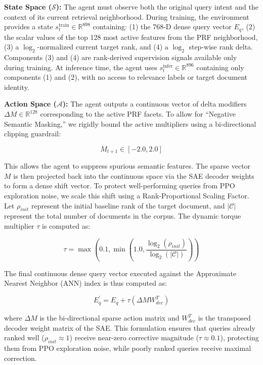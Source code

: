 \documentclass[sigconf]{acmart}
\begin{document}
\textbf{State Space ($\mathcal{S}$):} The agent must observe both the original query intent and the context of its current retrieval neighborhood. During training, the environment provides a state $s_t^{\text{train}} \in \mathbb{R}^{898}$ containing: (1) the 768-D dense query vector $E_q$, (2) the scalar values of the top 128 most active features from the PRF neighborhood, (3) a $\log_2$-normalized current target rank, and (4) a $\log_2$ step-wise rank delta. Components (3) and (4) are rank-derived supervision signals available only during training. At inference time, the agent uses $s_t^{\text{infer}} \in \mathbb{R}^{896}$ containing only components (1) and (2), with no access to relevance labels or target document identity.

\textbf{Action Space ($\mathcal{A}$):} The agent outputs a continuous vector of delta modifiers $\Delta M \in \mathbb{R}^{128}$ corresponding to the active PRF facets. To allow for ``Negative Semantic Masking,'' we rigidly bound the active multipliers using a bi-directional clipping guardrail:

\begin{equation}
M_{t+1} \in [-2.0, 2.0]
\end{equation}

This allows the agent to suppress spurious semantic features. The sparse vector $M$ is then projected back into the continuous space via the SAE decoder weights to form a dense shift vector. To protect well-performing queries from PPO exploration noise, we scale this shift using a Rank-Proportional Scaling Factor. Let $\rho_{init}$ represent the initial baseline rank of the target document, and $|\mathcal{C}|$ represent the total number of documents in the corpus. The dynamic torque multiplier $\tau$ is computed as:

\begin{equation}
\tau = \max\left(0.1, \min\left(1.0, \frac{\log_2(\rho_{init})}{\log_2(|\mathcal{C}|)}\right)\right)
\end{equation}

The final continuous dense query vector executed against the Approximate Nearest Neighbor (ANN) index is thus computed as:

\begin{equation}
E_q^{\prime} = E_q + \tau (\Delta M W_{dec}^T)
\end{equation}

where $\Delta M$ is the bi-directional sparse action matrix and $W_{dec}^T$ is the transposed decoder weight matrix of the SAE. This formulation ensures that queries already ranked well ($\rho_{init} \approx 1$) receive near-zero corrective magnitude ($\tau \approx 0.1$), protecting them from PPO exploration noise, while poorly ranked queries receive maximal correction.
\end{document}
